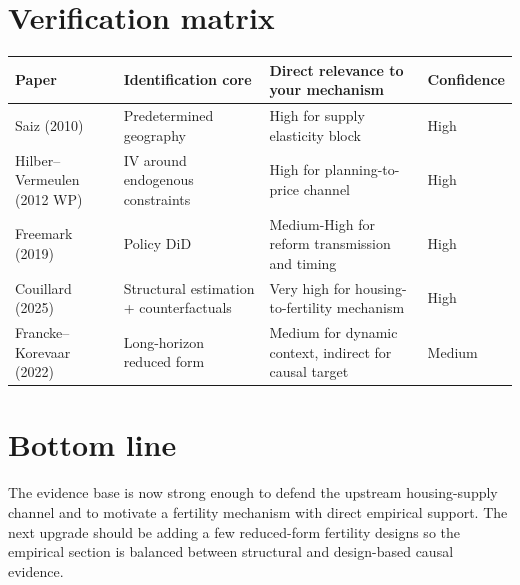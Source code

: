 \documentclass[11pt]{article}
\begin{document}
\section{Verification matrix}
\renewcommand{\arraystretch}{1.2}
\begin{tabular}{p{} p{} p{} p{}}
\toprule
Paper & Identification core & Direct relevance to your mechanism & Confidence \\
\midrule
Saiz (2010) & Predetermined geography & High for supply elasticity block & High \\
Hilber--Vermeulen (2012 WP) & IV around endogenous constraints & High for planning-to-price channel & High \\
Freemark (2019) & Policy DiD & Medium-High for reform transmission and timing & High \\
Couillard (2025) & Structural estimation + counterfactuals & Very high for housing-to-fertility mechanism & High \\
Francke--Korevaar (2022) & Long-horizon reduced form & Medium for dynamic context, indirect for causal target & Medium \\
\bottomrule
\end{tabular}

\section*{Bottom line}
The evidence base is now strong enough to defend the upstream housing-supply channel and to motivate a fertility mechanism with direct empirical support. The next upgrade should be adding a few reduced-form fertility designs so the empirical section is balanced between structural and design-based causal evidence.
\end{document}
